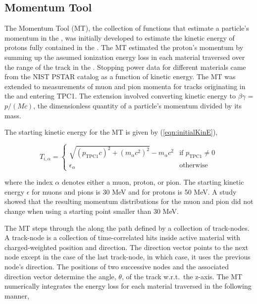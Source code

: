 \subsection{Momentum Tool}

The Momentum Tool (MT), the collection of functions that estimate a
particle's momentum in the \podtext{}, was initially developed to estimate
the kinetic energy of protons fully contained in the \podtext{}. The MT
estimated the proton's momentum by summing up the assumed ionization
energy loss in each material traversed over the range of the track in
the \podtext{}. Stopping power data for different materials
came from the NIST PSTAR catalog as a function of kinetic
energy. The MT was extended to
measurements of muon and pion momenta for tracks originating in the
\podtext{} and entering TPC1.  The extension involved converting kinetic
energy to $\beta\gamma$ = $p/(Mc)$, the dimensionless quantity of a
particle's momentum divided by its mass.

The starting kinetic energy for the MT is given by (\ref{eqn:initialKinE}),

\begin{equation}\label{eqn:initialKinE}
    T_{i,\alpha} =
        \begin{cases}
            \sqrt{{(p_\text{TPC1}c)}^2 + {(m_\alpha c^2)}^2} - m_\alpha c^2 &\mbox{if }p_\text{TPC1} \neq 0 \,\\
            \epsilon_\alpha &\mbox{otherwise} \,
        \end{cases}
\end{equation}

\noindent{}where the index $\alpha$ denotes either a muon, proton, or
pion. The starting kinetic energy $\epsilon$ for muons and pions is 30
MeV and for protons is 50 MeV. A study showed that the resulting momentum
distributions for the muon and pion did not change when using a starting point smaller than
30 MeV.


The MT steps through the \podtext{} along the path defined by a collection of track-nodes.
A track-node is a collection of time-correlated hits inside active material
with charged-weighted position and direction. The direction vector points to
the next node except in the case of the last track-node, in which case, it uses
the previous node's direction. The positions of two successive nodes and
the associated direction vector determine the angle, $\theta$, of the
track w.r.t.~the \podtext{} z-axis. The MT numerically integrates the energy
loss for each material traversed in the following manner,


